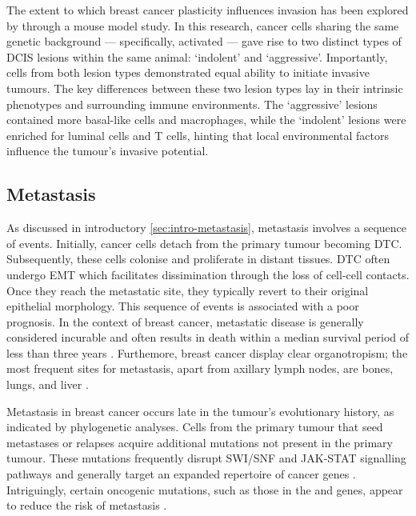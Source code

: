 The extent to which breast cancer plasticity influences invasion has been explored by \textcite{Sinha2021-mf} through a mouse model study. In this research, cancer cells sharing the same genetic background — specifically, activated  — gave rise to two distinct types of \ac{DCIS} lesions within the same animal: `indolent' and `aggressive'. Importantly, cells from both lesion types demonstrated equal ability to initiate invasive tumours. The key differences between these two lesion types lay in their intrinsic phenotypes and surrounding immune environments. The `aggressive' lesions contained more basal-like cells and macrophages, while the `indolent' lesions were enriched for luminal cells and T cells, hinting that local environmental factors influence the tumour's invasive potential.

\subsection{Metastasis}

As discussed in introductory \cref{sec:intro-metastasis}, metastasis involves a sequence of events. Initially, cancer cells detach from the primary tumour becoming \acf{DTC}. Subsequently, these cells colonise and proliferate in distant tissues. \ac{DTC} often undergo \ac{EMT} which facilitates dissimination through the loss of cell-cell contacts. Once they reach the metastatic site, they typically revert to their original epithelial morphology. This sequence of events is associated with a poor prognosis. In the context of breast cancer, metastatic disease is generally considered incurable and often results in death within a median survival period of less than three years \parencite{Harbeck2019-jx}. Furthemore, breast cancer display clear organotropism; the most frequent sites for metastasis, apart from axillary lymph nodes, are bones, lungs, and liver \parencite{Nguyen2022-jr}.

Metastasis in breast cancer occurs late in the tumour's evolutionary history, as indicated by phylogenetic analyses. Cells from the primary tumour that seed metastases or relapses acquire additional mutations not present in the primary tumour. These mutations frequently disrupt SWI/SNF and JAK-STAT signalling pathways and generally target an expanded repertoire of cancer genes \parencite{Yates2017-xc}. Intriguingly, certain oncogenic mutations, such as those in the  and  genes, appear to reduce the risk of metastasis \parencite{Nguyen2022-jr}. 

